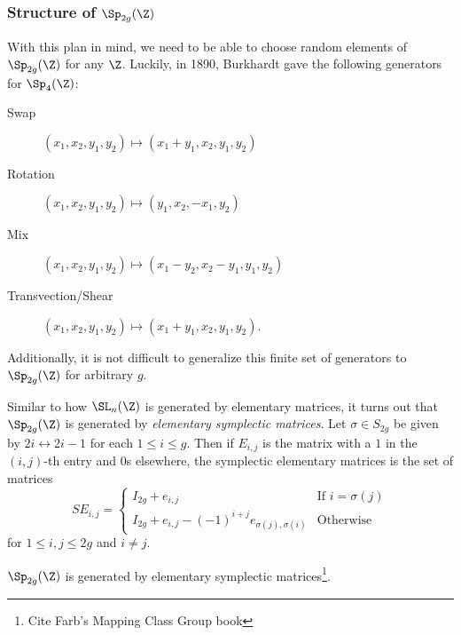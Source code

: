 \subsubsection{Structure of $\Sp_{2g}(\Z)$}

With this plan in mind, we need to be able to choose random elements of $\Sp_{2g}(\Z)$ for any $\Z$. Luckily, in 1890, Burkhardt gave the following generators for $\Sp_4(\Z)$: 
\begin{description}
	\item[Swap] $(x_1, x_2, y_1, y_2) \mapsto (x_1 + y_1, x_2, y_1, y_2)$
	\item[Rotation] $(x_1, x_2, y_1, y_2) \mapsto (y_1, x_2, -x_1, y_2)$
	\item[Mix] $(x_1, x_2, y_1, y_2) \mapsto (x_1 - y_2, x_2 - y_1, y_1, y_2)$
	\item[Transvection/Shear] $(x_1, x_2, y_1, y_2) \mapsto (x_1 + y_1, x_2, y_1, y_2)$.
\end{description}
Additionally, it is not difficult to generalize this finite set of generators to $\Sp_{2g}(\Z)$ for arbitrary $g$.
\begin{definition}
	Similar to how $\SL_n(\Z)$ is generated by elementary matrices, it turns out that $\Sp_{2g}(\Z)$ is generated by \textit{elementary symplectic matrices}. Let $\sigma \in S_{2g}$ be given by $2i \leftrightarrow 2i - 1$ for each $1 \leq i \leq g$. Then if $E_{i,j}$ is the matrix with a $1$ in the $(i,j)$-th entry and $0$s elsewhere, the symplectic elementary matrices is the set of matrices \[SE_{i,j} = \begin{cases}
		I_{2g} + e_{i,j} & \text{If $i = \sigma(j)$}\\
		I_{2g} + e_{i,j} - (-1)^{i + j}e_{\sigma(j),\sigma(i)} & \text{Otherwise}
	\end{cases}\] for $1 \leq i,j \leq 2g$ and $i \neq j$.
\end{definition}

\begin{theorem}
	$\Sp_{2g}(\Z)$ is generated by elementary symplectic matrices\footnote{Cite Farb's Mapping Class Group book}.
\end{theorem}

